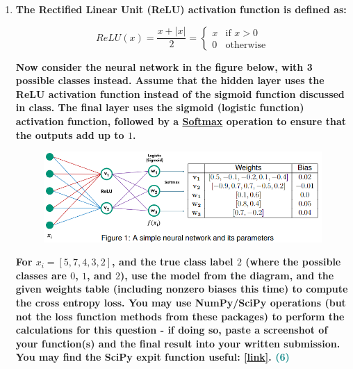 \documentclass[a4paper]{article}
\begin{document}
\begin{sloppypar}
\begin{enumerate}[start=1,label=Q\arabic*,left=0pt]
    \par
    
    \item \textbf{The Rectified Linear Unit (ReLU) activation function is defined as:}
    
    \[
    ReLU(x) = \frac{x + |x|}{2} = \begin{cases} 
    x & \text{if } x > 0 \\
    0 & \text{otherwise}
    \end{cases}
    \]

    \textbf{Now consider the neural network in the figure below, with 3 possible classes instead.
    Assume that the hidden layer uses the ReLU activation function instead of the sigmoid
    function discussed in class. The final layer uses the sigmoid (logistic function) activation
    function, followed by a \href{https://en.wikipedia.org/wiki/Softmax_function}{Softmax} operation to 
    ensure that the outputs add up to $1$.}

    \begin{figure}[H]
        \centering  
        \includegraphics[height=0.18\textheight]{Q2_NN.png}
        \label{fig:Q2_NN}
    \end{figure}

    \textbf{For $x_i = [5, 7, 4, 3, 2]$, and the true class label $2$ (where the possible classes are $0$, $1$, and
    $2$), use the model from the diagram, and the given weights table (including nonzero biases
    this time) to compute the cross entropy loss. You may use NumPy/SciPy operations (but
    not the loss function methods from these packages) to perform the calculations for this
    question - if doing so, paste a screenshot of your function(s) and the final result into your
    written submission. You may find the SciPy expit function useful: \href{https://docs.scipy.org/doc/scipy/reference/generated/scipy.special.expit.html\#scipy.special.expit}{[link]}. \hfill \textcolor{teal}{(6)}}
    
    \par
    

\end{enumerate}
\end{sloppypar}
\end{document}
